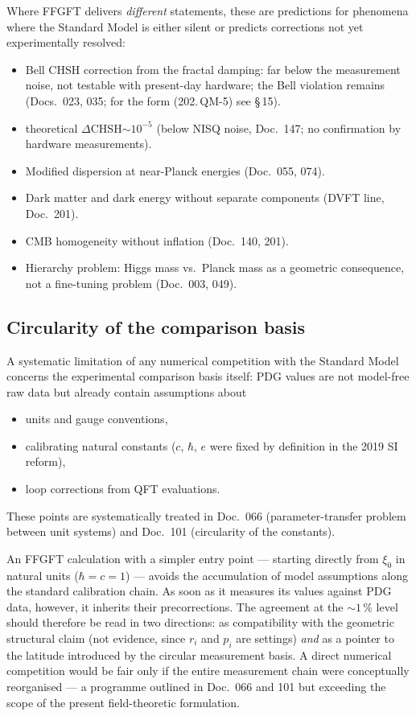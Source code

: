 Where FFGFT delivers \emph{different} statements, these are
predictions for phenomena where the Standard Model is either silent
or predicts corrections not yet experimentally resolved:

\begin{itemize}\setlength\itemsep{0pt}
  \item Bell CHSH correction from the fractal damping: far below the
        measurement noise, not testable with present-day hardware; the
        Bell violation remains (Docs.~023, 035; for the form
        (202.\,QM-5) see \S\,15).
  \item theoretical $\Delta$CHSH$\sim 10^{-5}$ (below NISQ noise,
        Doc.~147; no confirmation by hardware measurements).
  \item Modified dispersion at near-Planck energies (Doc.~055, 074).
  \item Dark matter and dark energy without separate components
        (DVFT line, Doc.~201).
  \item CMB homogeneity without inflation (Doc.~140, 201).
  \item Hierarchy problem: Higgs mass vs.\ Planck mass as a geometric
        consequence, not a fine-tuning problem (Doc.~003, 049).
\end{itemize}

\subsection*{Circularity of the comparison basis}

A systematic limitation of any numerical competition with the
Standard Model concerns the experimental comparison basis itself:
PDG values are not model-free raw data but already contain assumptions
about
\begin{itemize}\setlength\itemsep{0pt}
  \item units and gauge conventions,
  \item calibrating natural constants ($c$, $\hbar$, $e$ were fixed
        by definition in the 2019 SI reform),
  \item loop corrections from QFT evaluations.
\end{itemize}
These points are systematically treated in Doc.~066 (parameter-transfer
problem between unit systems) and Doc.~101 (circularity of the
constants).

An FFGFT calculation with a simpler entry point --- starting directly
from $\xi_0$ in natural units ($\hbar = c = 1$) --- avoids the
accumulation of model assumptions along the standard calibration
chain. As soon as it measures its values against PDG data, however,
it inherits their precorrections. The agreement at the $\sim 1\,\%$
level should therefore be read in two directions: as compatibility with
the geometric structural claim (not evidence, since $r_i$ and $p_i$ are
settings) \emph{and} as a pointer to the
latitude introduced by the circular measurement basis. A direct
numerical competition would be fair only if the entire measurement
chain were conceptually reorganised --- a programme outlined in
Doc.~066 and 101 but exceeding the scope of the present field-theoretic
formulation.


